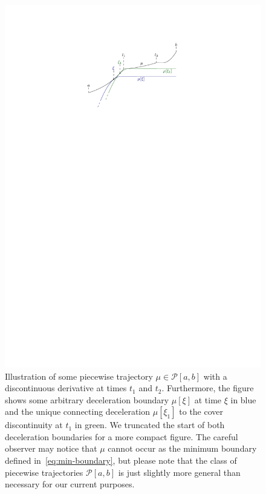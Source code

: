 \documentclass[a4paper]{article}
\theoremstyle{definition}
\theoremstyle{plain}
\begin{document}
\begin{figure}
  \centering
  \includegraphics[scale=1.1]{figures/motion/deceleration-boundary}
  \caption{Illustration of some piecewise trajectory $\mu \in \mathcal{P}[a,b]$ with
    a discontinuous derivative at times $t_{1}$ and $t_{2}$. Furthermore, the
    figure shows some arbitrary deceleration boundary $\mu[\xi]$ at time $\xi$ in blue
    and the unique connecting deceleration $\mu[\xi_{1}]$ to the cover discontinuity at
    $t_{1}$ in green. We truncated the start of both deceleration boundaries for
    a more compact figure. The careful observer may notice that $\mu$ cannot occur
    as the minimum boundary defined in~\eqref{eq:min-boundary}, but please note that the class of
    piecewise trajectories $\mathcal{P}[a,b]$ is just slightly more general than
    necessary for our current purposes.}%
  \label{fig:deceleration-boundary}
\end{figure}
\end{document}
